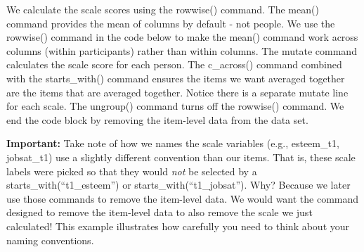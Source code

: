 \documentclass[
]{krantz}
\begin{document}
We calculate the scale scores using the rowwise() command. The mean() command provides the mean of columns by default - not people. We use the rowwise() command in the code below to make the mean() command work across columns (within participants) rather than within columns. The mutate command calculates the scale score for each person. The c\_across() command combined with the starts\_with() command ensures the items we want averaged together are the items that are averaged together. Notice there is a separate mutate line for each scale. The ungroup() command turns off the rowwise() command. We end the code block by removing the item-level data from the data set.

\textbf{Important:} Take note of how we names the scale variables (e.g., esteem\_t1, jobsat\_t1) use a slightly different convention than our items. That is, these scale labels were picked so that they would \emph{not} be selected by a starts\_with(``t1\_esteem'') or starts\_with(``t1\_jobsat''). Why? Because we later use those commands to remove the item-level data. We would want the command designed to remove the item-level data to also remove the scale we just calculated! This example illustrates how carefully you need to think about your naming conventions.
\end{document}
